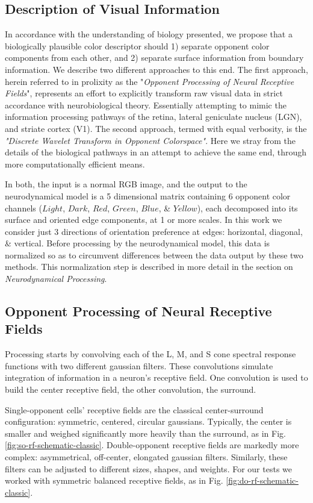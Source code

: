 \documentclass[journal,onecolumn]{IEEEtran}
\begin{document}
\subsection*{Description of Visual Information}

In accordance with the understanding of biology presented, we propose that a biologically plausible color descriptor should 1) separate opponent color components from each other, and 2) separate surface information from boundary information. We describe two different approaches to this end. The first approach, herein referred to in prolixity as the "\textit{Opponent Processing of Neural Receptive Fields}", represents an effort to explicitly transform raw visual data in strict accordance with neurobiological theory. Essentially attempting to mimic the information processing pathways of the retina, lateral geniculate nucleus (LGN), and striate cortex (V1). The second approach, termed with equal verbosity, is the \textit{"Discrete Wavelet Transform in Opponent Colorspace"}. Here we stray from the details of the biological pathways in an attempt to achieve the same end, through more computationally efficient means.

In both, the input is a normal RGB image, and the output to the neurodynamical model is a 5 dimensional matrix containing 6 opponent color channels ($Light$, $Dark$, $Red$, $Green$, $Blue$, \& $Yellow$), each decomposed into its surface and oriented edge components, at 1 or more scales. In this work we consider just 3 directions of orientation preference at edges: horizontal, diagonal, \& vertical. Before processing by the neurodynamical model, this data is normalized so as to circumvent differences between the data output by these two methods. This normalization step is described in more detail in the section on \textit{Neurodynamical Processing}.

\subsection{Opponent Processing of Neural Receptive Fields}

Processing starts by convolving each of the L, M, and S cone spectral response functions with two different gaussian filters. These convolutions simulate integration of information in a neuron's receptive field. One convolution is used to build the center receptive field, the other convolution, the surround.

Single-opponent cells' receptive fields are the classical center-surround configuration: symmetric, centered, circular gaussians. Typically, the center is smaller and weighed significantly more heavily than the surround, as in Fig. \ref{fig:so-rf-schematic-classic}. Double-opponent receptive fields are markedly more complex: asymmetrical, off-center, elongated gaussian filters. Similarly, these filters can be adjusted to different sizes, shapes, and weights. For our tests we worked with symmetric balanced receptive fields, as in Fig. \ref{fig:do-rf-schematic-classic}.
\end{document}

